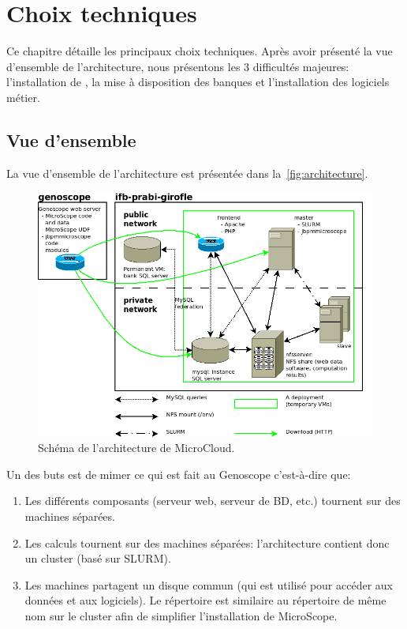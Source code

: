 \chapter{Choix techniques} \label{chap:choix_techniques}

Ce chapitre détaille les principaux choix techniques.
Après avoir présenté la vue d'ensemble de l'architecture, nous présentons les 3 difficultés majeures:
l'installation de , la mise à disposition des banques et
l'installation des logiciels métier.

\section{Vue d'ensemble}

La vue d'ensemble de l'architecture est présentée dans la~\autoref{fig:architecture}.

\begin{figure}[htp]
    \centering
    \includegraphics[width=\linewidth]{../Architecture}
    \caption{Schéma de l'architecture de MicroCloud.}
    \label{fig:architecture}
\end{figure}

Un des buts est de mimer ce qui est fait au Genoscope
c'est-à-dire que:
\begin{enumerate}
    \item Les différents composants (serveur web, serveur de BD, etc.) tournent sur des machines séparées.
    \item Les calculs tournent sur des machines séparées: l'architecture contient donc un cluster (basé sur SLURM).
    \item Les machines partagent un disque commun (qui est utilisé pour accéder aux données et aux logiciels).
          Le répertoire  est similaire au répertoire de même nom sur le cluster 
          afin de simplifier l'installation de MicroScope.
\end{enumerate}\vspace*{\baselineskip}

